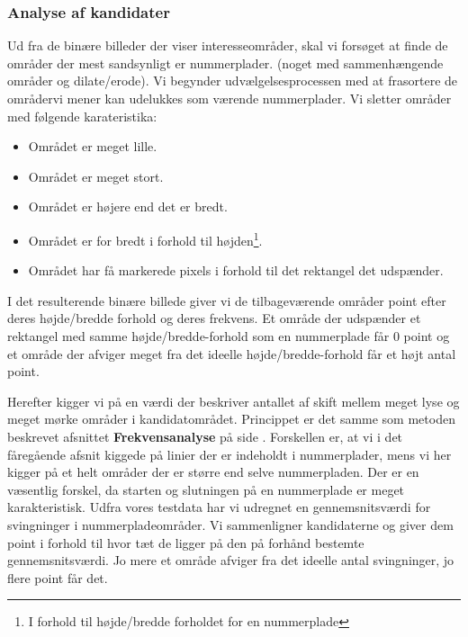 
\subsubsection{Analyse af kandidater}
\label{sec:kandidater}
Ud fra de binære billeder der viser interesseområder, skal vi forsøget at finde de områder der mest sandsynligt er nummerplader. (noget med sammenhængende områder og dilate/erode). Vi begynder udvælgelsesprocessen med at frasortere de områdervi mener kan udelukkes som værende nummerplader. Vi sletter områder med følgende karateristika:
\begin{itemize}
\item Området er meget lille.
\item Området er meget stort.
\item Området er højere end det er bredt.
\item Området er for bredt i forhold til højden\footnote{I forhold til højde/bredde forholdet for en nummerplade}.
\item Området har få markerede pixels i forhold til det rektangel det udspænder.
\end{itemize}


I det resulterende binære billede giver vi de tilbageværende områder point efter deres højde/bredde forhold og deres frekvens. Et område der udspænder et rektangel med samme højde/bredde-forhold som en nummerplade får 0 point og et område der afviger meget fra det ideelle højde/bredde-forhold får et højt antal point.

Herefter kigger vi på en værdi der beskriver antallet af skift mellem meget lyse og meget mørke områder i kandidatområdet. Princippet er det samme som metoden beskrevet afsnittet \textbf{Frekvensanalyse} på side \pageref{sec_frekvensanalyse}. Forskellen er, at vi i det fåregående afsnit kiggede på linier der er indeholdt i nummerplader, mens vi her kigger på et helt områder der er større end selve nummerpladen. Der er en væsentlig forskel, da starten og slutningen på en nummerplade er meget karakteristisk. Udfra vores testdata har vi udregnet en gennemsnitsværdi for svingninger i nummerpladeområder. Vi sammenligner kandidaterne og giver dem point i forhold til hvor tæt de ligger på den på forhånd bestemte gennemsnitsværdi. Jo mere et område afviger fra det ideelle antal svingninger, jo flere point får det.

